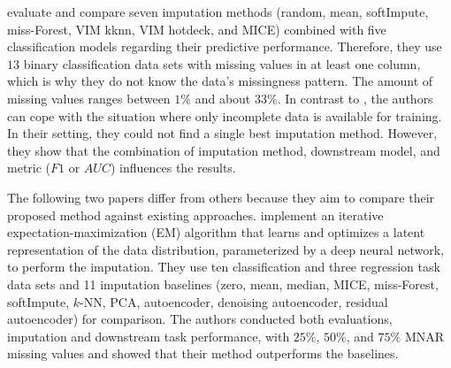 \documentclass[utf8]{frontiersSCNS} %
\begin{document}
\cite{Imputation_Benchmark_1} evaluate and compare seven imputation methods (random, mean, softImpute, miss-Forest, VIM kknn, VIM hotdeck, and MICE) combined with five classification models regarding their predictive performance. Therefore,  they use $13$ binary classification data sets with missing values in at least one column, which is why they do not know the data's missingness pattern. The amount of missing values ranges between $1\%$ and about $33\%$. In contrast to \cite{Imputation_Benchmark_3, Imputation_Benchmark_2}, the authors can cope with the situation where only incomplete data is available for training. In their setting, they could not find a single best imputation method. However, they show that the combination of imputation method, downstream model, and metric ($F1$ or $AUC$) influences the results.

The following two papers differ from others because they aim to compare their proposed method against existing approaches. \cite{Imputation_Benchmark_6} implement an iterative expectation-maximization (EM) algorithm that learns and optimizes a latent representation of the data distribution, parameterized by a deep neural network, to perform the imputation. They use ten classification and three regression task data sets and 11 imputation baselines (zero, mean, median, MICE, miss-Forest, softImpute, $k$-NN, PCA, autoencoder, denoising autoencoder, residual autoencoder) for comparison. The authors conducted both evaluations, imputation and downstream task performance, with $25\%$, $50\%$, and $75\%$ MNAR missing values and showed that their method outperforms the baselines.
\end{document}
